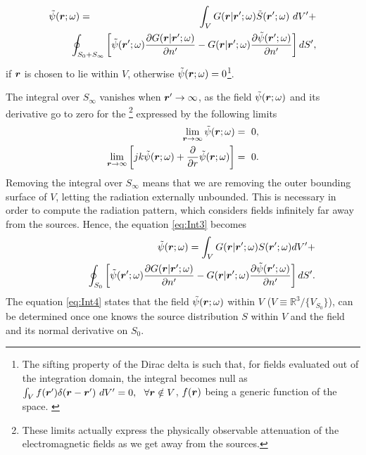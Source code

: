 \begin{eqnarray}
\label{eq:Int3}
\tilde{\psi}(\mbfit{r}; \omega) &= &\int_V G(\mbfit{r}|\mbfit{r'}; \omega) \tilde{S}(\mbfit{r'}; \omega) \ dV'  + \nonumber \\
& & \hspace{-1cm} \oint_{S_0+S_{\infty}} \left [  \tilde{\psi}(\mbfit{r'}; \omega) \frac{ \partial G(\mbfit{r}|\mbfit{r'}; \omega) }{\partial{n'}} - G(\mbfit{r}|\mbfit{r'}; \omega) \frac{\partial{\tilde{\psi}(\mbfit{r'}; \omega)}}{\partial{n'}} \right ] dS',
\end{eqnarray} if $\mbfit{r}$ is chosen to lie within $V$, otherwise $\tilde{\psi}(\mbfit{r}; \omega) = 0$\footnote{The sifting property of the Dirac delta is such that, for fields evaluated out of the integration domain, the integral becomes null as $\int_V f(\mbfit{r}' ) \delta (\mbfit{r} - \mbfit{r'}) \ dV' = 0, \ \ \forall \mbfit{r} \notin V$, $f(\mbfit{r})$ being a generic function of the space. \label{fn:Extinction}}.
\par The integral over $S_\infty$ vanishes when $\mbfit{r'} \rightarrow \infty$, as the field $\tilde{\psi}(\mbfit{r}; \omega)$ and its derivative go to zero for the \footnote{These limits actually express the physically observable attenuation of the electromagnetic fields as we get away from the sources.} expressed by the following limits
\begin{eqnarray}
 \lim_{\mbfit{r} \to \infty} \tilde{\psi}(\mbfit{r}; \omega)  &= \ 0,\\
 \lim_{\mbfit{r} \to \infty} \left [ jk \tilde{\psi}(\mbfit{r}; \omega) + \frac{\partial}{\partial{r}} \tilde{\psi}(\mbfit{r}; \omega) \right ] &= \ 0.
\end{eqnarray} Removing the integral over $S_\infty$ means that we are removing the outer bounding surface of $V$, letting the radiation externally unbounded. This is necessary in order to compute the radiation pattern, which considers fields infinitely far away from the sources. Hence, the equation \eqref{eq:Int3} becomes
\begin{eqnarray}
\label{eq:Int4}
& &\tilde{\psi}(\mbfit{r}; \omega) = \int_V G(\mbfit{r}|\mbfit{r'}; \omega) S(\mbfit{r'}; \omega) dV'  + \nonumber \\
& &\hspace{1cm} \oint_{S_0} \left [ \tilde{\psi}(\mbfit{r'}; \omega) \frac{ \partial G(\mbfit{r}|\mbfit{r'}; \omega) }{\partial{n'}} - G(\mbfit{r}|\mbfit{r'}; \omega) \frac{\partial{\tilde{\psi}(\mbfit{r'}; \omega)}}{\partial{n'}} \right ] dS'.
\end{eqnarray} The equation \eqref{eq:Int4} states that the field $\tilde{\psi}(\mbfit{r}; \omega)$ within $V$ ($ V \equiv \mathbb{R}^3 / \{ V_{S_0} \}$), can be determined once one knows the source distribution $S$ within $V$ and the field and its normal derivative on $S_0$.

